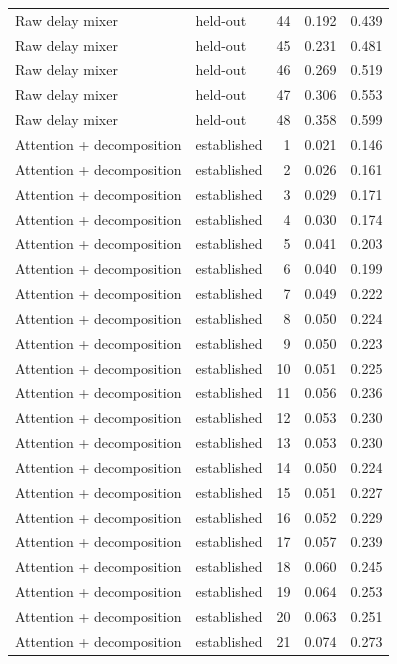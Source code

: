 \begin{tabular}{llrrr}
Raw delay mixer & held-out & 44 & 0.192 & 0.439 \\
Raw delay mixer & held-out & 45 & 0.231 & 0.481 \\
Raw delay mixer & held-out & 46 & 0.269 & 0.519 \\
Raw delay mixer & held-out & 47 & 0.306 & 0.553 \\
Raw delay mixer & held-out & 48 & 0.358 & 0.599 \\
Attention + decomposition & established & 1 & 0.021 & 0.146 \\
Attention + decomposition & established & 2 & 0.026 & 0.161 \\
Attention + decomposition & established & 3 & 0.029 & 0.171 \\
Attention + decomposition & established & 4 & 0.030 & 0.174 \\
Attention + decomposition & established & 5 & 0.041 & 0.203 \\
Attention + decomposition & established & 6 & 0.040 & 0.199 \\
Attention + decomposition & established & 7 & 0.049 & 0.222 \\
Attention + decomposition & established & 8 & 0.050 & 0.224 \\
Attention + decomposition & established & 9 & 0.050 & 0.223 \\
Attention + decomposition & established & 10 & 0.051 & 0.225 \\
Attention + decomposition & established & 11 & 0.056 & 0.236 \\
Attention + decomposition & established & 12 & 0.053 & 0.230 \\
Attention + decomposition & established & 13 & 0.053 & 0.230 \\
Attention + decomposition & established & 14 & 0.050 & 0.224 \\
Attention + decomposition & established & 15 & 0.051 & 0.227 \\
Attention + decomposition & established & 16 & 0.052 & 0.229 \\
Attention + decomposition & established & 17 & 0.057 & 0.239 \\
Attention + decomposition & established & 18 & 0.060 & 0.245 \\
Attention + decomposition & established & 19 & 0.064 & 0.253 \\
Attention + decomposition & established & 20 & 0.063 & 0.251 \\
Attention + decomposition & established & 21 & 0.074 & 0.273 \\

\end{tabular}

